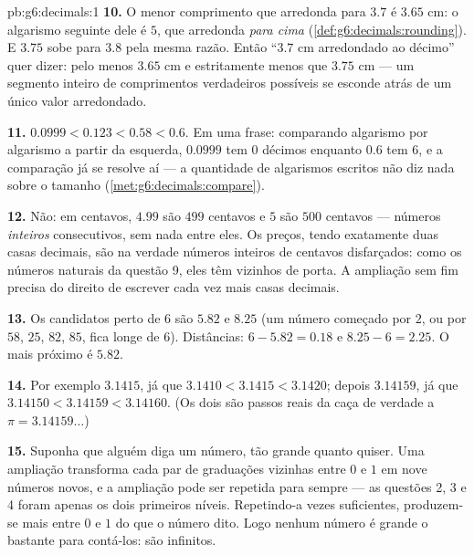 \begin{solution}{pb:g6:decimals:1}
\textbf{10.} O menor comprimento que arredonda para $3.7$ é $3.65$ cm:
o algarismo seguinte dele é $5$, que arredonda \emph{para cima}
(\cref{def:g6:decimals:rounding}). E $3.75$ sobe para $3.8$ pela mesma
razão. Então ``$3.7$ cm arredondado ao décimo'' quer dizer: pelo menos
$3.65$ cm e estritamente menos que $3.75$ cm --- um segmento inteiro de
comprimentos verdadeiros possíveis se esconde atrás de um único valor
arredondado.

\textbf{11.} $0.0999 < 0.123 < 0.58 < 0.6$. Em uma frase: comparando
algarismo por algarismo a partir da esquerda, $0.0999$ tem $0$ décimos
enquanto $0.6$ tem $6$, e a comparação já se resolve aí --- a
quantidade de algarismos escritos não diz nada sobre o tamanho
(\cref{met:g6:decimals:compare}).

\textbf{12.} Não: em centavos, $4.99$ são $499$ centavos e $5$ são
$500$ centavos --- números \emph{inteiros} consecutivos, sem nada entre
eles. Os preços, tendo exatamente duas casas decimais, são na verdade
números inteiros de centavos disfarçados: como os números naturais da
questão 9, eles têm vizinhos de porta. A ampliação sem fim precisa do
direito de escrever cada vez mais casas decimais.

\textbf{13.} Os candidatos perto de $6$ são $5.82$ e $8.25$ (um número
começado por $2$, ou por $58$, $25$, $82$, $85$, fica longe de $6$).
Distâncias: $6 - 5.82 = 0.18$ e $8.25 - 6 = 2.25$. O mais próximo é
$5.82$.

\textbf{14.} Por exemplo $3.1415$, já que
$3.1410 < 3.1415 < 3.1420$; depois $3.14159$, já que
$3.14150 < 3.14159 < 3.14160$. (Os dois são passos reais da caça de
verdade a $\pi = 3.14159\dots$)

\textbf{15.} Suponha que alguém diga um número, tão grande quanto
quiser. Uma ampliação transforma cada par de graduações vizinhas entre
$0$ e $1$ em nove números novos, e a ampliação pode ser repetida para
sempre --- as questões 2, 3 e 4 foram apenas os dois primeiros níveis.
Repetindo-a vezes suficientes, produzem-se mais  entre
$0$ e $1$ do que o número dito. Logo nenhum número é grande o bastante
para contá-los: são infinitos.
\end{solution}

